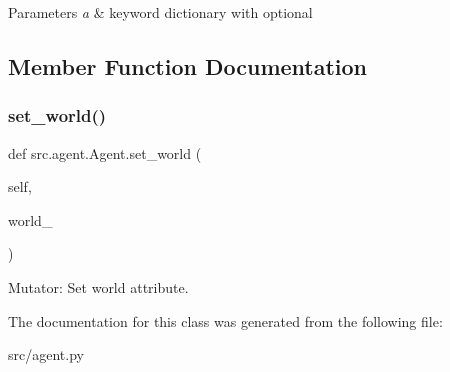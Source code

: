 \begin{DoxyParams}{Parameters}
{\em a} & keyword dictionary with optional \\
\hline
\end{DoxyParams}


\subsection{Member Function Documentation}
\mbox{\label{classsrc_1_1agent_1_1_agent_a5c84bc253f7ae188d87a839dbe73773a}} 
\subsubsection{\texorpdfstring{set\+\_\+world()}{set\_world()}}
{\footnotesize\ttfamily def src.\+agent.\+Agent.\+set\+\_\+world (\begin{DoxyParamCaption}\item[{}]{self,  }\item[{}]{world\+\_\+ }\end{DoxyParamCaption})}



Mutator\+: Set world attribute. 



The documentation for this class was generated from the following file\+:\begin{DoxyCompactItemize}
\item 
src/agent.\+py\end{DoxyCompactItemize}
